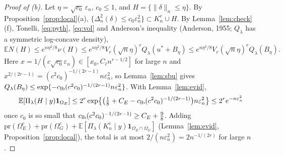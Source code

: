 \documentclass[11pt]{article}
\theoremstyle{definition}
\theoremstyle{remark}
\newcommand{\E}{\mathbb{E}}
\newcommand{\pr}{\mathrm{pr}}
\newcommand{\en}{\varepsilon_n}
\newcommand{\Ql}{Q_\lambda}
\newcommand{\nn}[1]{\|#1\|_n}
\newcommand{\ind}{\mathbf 1}
\begin{document}
\begin{proof}[Proof of (b)]
Let $\eta=\sqrt{c_0}\,\en$, $c_0\le1$, and $H=\{\nn{\delta}\le\eta\}$. By Proposition~\ref{prop:local}(a), $\{\Delta_n^2(\delta)\le c_0\en^2\}\subset K_n^c\cup H$. By Lemma~\ref{lem:check}(f), Tonelli, \eqref{eq:pyth}, \eqref{eq:vol} and Anderson's inequality (Anderson, 1955; $\Ql$ has a symmetric log-concave density),
\[
\E N(H)\le e^{n\eta^2/8}\nu(H)\le e^{n\eta^2/8}V_r(\sqrt n\eta)^r\Ql(u^{*}+B_\eta)\le e^{n\eta^2/8}V_r(\sqrt n\eta)^r\Ql(B_\eta).
\]
Here $x=1/(c\sqrt{c_0}\en)\in[x_0,C_\ell n^{r-1/2}]$ for large $n$ and $x^{2/(2r-1)}=(c^2c_0)^{-1/(2r-1)}n\en^2$, so Lemma~\ref{lem:sbu} gives $\Ql(B_\eta)\le\exp\{-c_{\rm lb}(c^2c_0)^{-1/(2r-1)}n\en^2\}$. With Lemma~\ref{lem:evid},
\[
\E[\Pi_\lambda(H\mid y)\ind_{\Omega_E}]\le2^r\exp\bigl\{\bigl(\tfrac18+C_E-c_{\rm lb}(c^2c_0)^{-1/(2r-1)}\bigr)n\en^2\bigr\}\le2^re^{-n\en^2}
\]
once $c_0$ is so small that $c_{\rm lb}(c^2c_0)^{-1/(2r-1)}\ge C_E+\frac98$. Adding $\pr(\Omega_E^c)+\pr(\Omega_G^c)+\E[\Pi_\lambda(K_n^c\mid y)\ind_{\Omega_E\cap\Omega_G}]$ (Lemma~\ref{lem:evid}, Proposition~\ref{prop:local}), the total is at most $2/(n\en^2)=2n^{-1/(2r)}$ for large $n$.
\end{proof}
\end{document}
